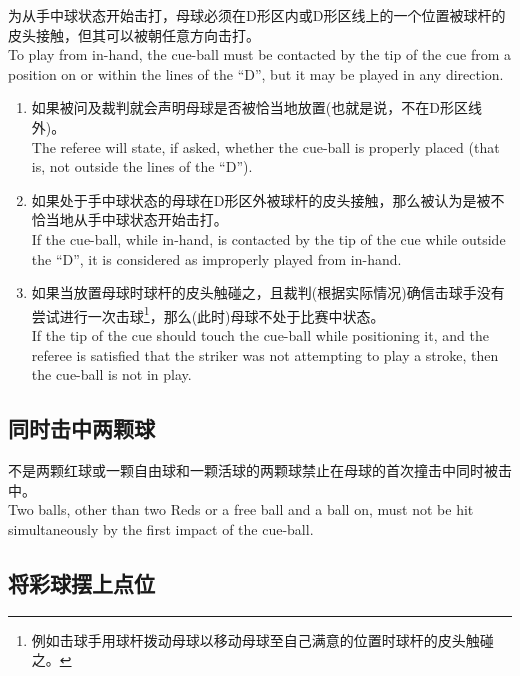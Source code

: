 \noindent 为从手中球状态开始击打，母球必须在D形区内或D形区线上的一个位置被球杆的皮头接触，但其可以被朝任意方向击打。\\
To play from in-hand, the cue-ball must be contacted by the tip of the cue from a position on or within the lines of the ``D'', but it may be played in any direction.
\begin{enumerate}[label=(\alph*)]
    \item 如果被问及裁判就会声明母球是否被恰当地放置(也就是说，不在D形区线外)。\\
    The referee will state, if asked, whether the cue-ball is properly placed (that is, not outside the lines of the ``D'').
    \item 如果处于手中球状态的母球在D形区外被球杆的皮头接触，那么被认为是被不恰当地从手中球状态开始击打。\\
    If the cue-ball, while in-hand, is contacted by the tip of the cue while outside the ``D'', it is considered as improperly played from in-hand.
    \item 如果当放置母球时球杆的皮头触碰之，且裁判(根据实际情况)确信击球手没有尝试进行一次击球\footnote{例如击球手用球杆拨动母球以移动母球至自己满意的位置时球杆的皮头触碰之。}，那么(此时)母球不处于比赛中状态。\\
    If the tip of the cue should touch the cue-ball while positioning it, and the referee is satisfied that the striker was not attempting to play a stroke, then the cue-ball is not in play.
\end{enumerate}

\subsection{同时击中两颗球}

\noindent 不是两颗红球或一颗自由球和一颗活球的两颗球禁止在母球的首次撞击中同时被击中。\\
Two balls, other than two Reds or a free ball and a ball on, must not be hit simultaneously by the first impact of the cue-ball.

\subsection{将彩球摆上点位}\label{2237}

